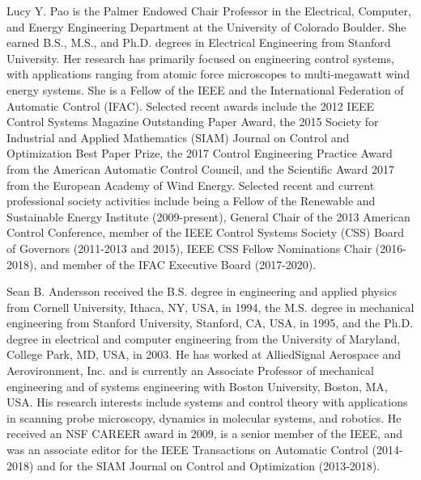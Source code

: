 \documentclass[journal]{IEEEtran}
\begin{document}
\begin{IEEEbiography}
  {Lucy Y. Pao} 
  is the Palmer Endowed Chair Professor in the Electrical, Computer, and Energy Engineering Department at the University of Colorado Boulder. She earned B.S., M.S., and Ph.D. degrees in Electrical Engineering from Stanford University. Her research has primarily focused on engineering control systems, with applications ranging from atomic force microscopes to multi-megawatt wind energy systems. She is a Fellow of the IEEE and the International Federation of Automatic Control (IFAC). Selected recent awards include the 2012 IEEE Control Systems Magazine Outstanding Paper Award, the 2015 Society for Industrial and Applied Mathematics (SIAM) Journal on Control and Optimization Best Paper Prize, the 2017 Control Engineering Practice Award from the American Automatic Control Council, and the Scientific Award 2017 from the European Academy of Wind Energy. Selected recent and current professional society activities include being a Fellow of the Renewable and Sustainable Energy Institute (2009-present), 
  General Chair of the 2013 American Control Conference, member of the IEEE Control Systems Society (CSS) Board of Governors (2011-2013 and 2015), IEEE CSS Fellow Nominations Chair (2016-2018), and member of the IFAC Executive Board (2017-2020).    
\end{IEEEbiography}
\begin{IEEEbiography}
  {Sean B. Andersson}
received the B.S. degree in engineering and applied physics from Cornell University, Ithaca, NY, USA, in 1994, the M.S. degree in mechanical engineering from Stanford University, Stanford, CA, USA, in 1995, and the Ph.D. degree in electrical and computer engineering from the University of Maryland, College Park, MD, USA, in 2003. He has worked at AlliedSignal Aerospace and Aerovironment, Inc. and is currently an Associate Professor of mechanical engineering and of systems engineering with Boston University, Boston, MA, USA. His research interests include systems and control theory with applications in scanning probe microscopy, dynamics in molecular systems, and robotics. He received an NSF CAREER award in 2009, is a senior member of the IEEE, and was an associate editor for the IEEE Transactions on Automatic Control (2014-2018) and for the SIAM Journal on Control and Optimization (2013-2018).
\end{IEEEbiography} 



\end{document}
